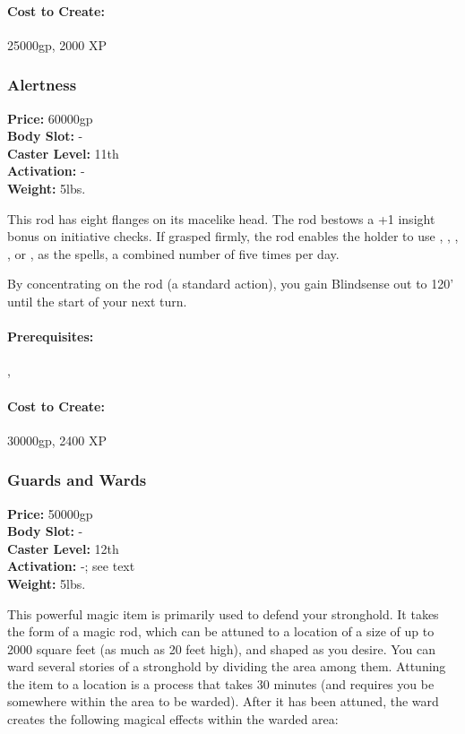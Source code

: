 \paragraph{Cost to Create:} 25000gp, 2000 XP

\subsubsection{Alertness}
\textbf{Price:} 60000gp\\
\textbf{Body Slot:} -\\
\textbf{Caster Level:} 11th\\
\textbf{Activation:} -\\
\textbf{Weight:} 5lbs.

This rod has eight flanges on its macelike head. 
The rod bestows a +1 insight bonus on initiative checks. 
If grasped firmly, the rod enables the holder to use , , , , or , as the spells, a combined number of five times per day. 

By concentrating on the rod (a standard action), you gain Blindsense out to 120' until the start of your next turn.

\paragraph{Prerequisites:} , 

\paragraph{Cost to Create:} 30000gp, 2400 XP
\subsubsection{Guards and Wards}
\textbf{Price:} 50000gp\\
\textbf{Body Slot:} -\\
\textbf{Caster Level:} 12th\\
\textbf{Activation:} -; see text\\
\textbf{Weight:} 5lbs.

This powerful magic item is primarily used to defend your stronghold.
It takes the form of a magic rod, which can be attuned to a location of a size of up to 2000 square feet (as much as 20 feet high), and shaped as you desire. 
You can ward several stories of a stronghold by dividing the area among them.  
Attuning the item to a location is a process that takes 30 minutes (and requires you be somewhere within the area to be warded).
After it has been attuned, the ward creates the following magical effects within the warded area:
